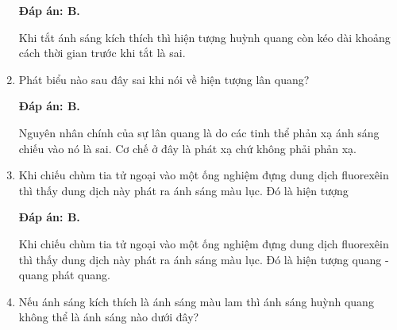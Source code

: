 \begin{enumerate}[label=\bfseries Câu \arabic*:]
	\loigiai
	{		\textbf{Đáp án: B.}
		
Khi tắt ánh sáng kích thích thì hiện tượng huỳnh quang còn kéo dài khoảng cách thời gian trước khi tắt là sai.
		
	}
	
	\item {} 
		\cauhoi
	{Phát biểu nào sau đây sai khi nói về hiện tượng lân quang?
	}
	
	\loigiai
	{		\textbf{Đáp án: B.}
		
Nguyên nhân chính của sự lân quang là do các tinh thể phản xạ ánh sáng chiếu vào nó là sai. Cơ chế ở đây là phát xạ chứ không phải phản xạ.
		
	}
	
	\item {} 
		\cauhoi
	{Khi chiếu chùm tia tử ngoại vào một ống nghiệm đựng dung dịch fluorexêin thì thấy dung dịch này phát ra ánh sáng màu lục. Đó là hiện tượng
	}
	
	\loigiai
	{		\textbf{Đáp án: B.}
		
Khi chiếu chùm tia tử ngoại vào một ống nghiệm đựng dung dịch fluorexêin thì thấy dung dịch này phát ra ánh sáng màu lục. Đó là hiện tượng quang - quang phát quang.
		
	}
	
\item {} 
		\cauhoi
	{Nếu ánh sáng kích thích là ánh sáng màu lam thì ánh sáng huỳnh quang không thể là ánh sáng nào dưới đây?
	}
	

\end{enumerate}
